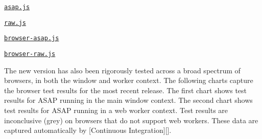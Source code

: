 \begin{DoxyItemize}
\item \href{https://github.com/kriskowal/asap/blob/master/asap.js}{\tt asap.\+js}
\item \href{https://github.com/kriskowal/asap/blob/master/raw.js}{\tt raw.\+js}
\item \href{https://github.com/kriskowal/asap/blob/master/browser-asap.js}{\tt browser-\/asap.\+js}
\item \href{https://github.com/kriskowal/asap/blob/master/browser-raw.js}{\tt browser-\/raw.\+js}
\end{DoxyItemize}

The new version has also been rigorously tested across a broad spectrum of browsers, in both the window and worker context. The following charts capture the browser test results for the most recent release. The first chart shows test results for A\+S\+AP running in the main window context. The second chart shows test results for A\+S\+AP running in a web worker context. Test results are inconclusive (grey) on browsers that do not support web workers. These data are captured automatically by \mbox{[}Continuous Integration\mbox{]}\mbox{[}\mbox{]}.



 